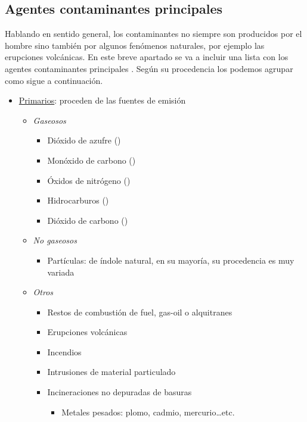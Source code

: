  
  \subsection{Agentes contaminantes principales}
 
 Hablando en sentido general, los contaminantes no siempre son producidos por el hombre sino también por algunos fenómenos naturales, por ejemplo las erupciones volcánicas. En este breve apartado se va a incluir una lista con los agentes contaminantes principales \cite{_sistema_vigilancia_madrid}. Según su procedencia los podemos agrupar como sigue a continuación.
 
 \begin{itemize}
 	\item \underline{Primarios}: proceden de las fuentes de emisión
 	\begin{itemize}
 		\item \textit{Gaseosos}
 			\begin{itemize}
 				\item 	Dióxido de azufre ()
 				\item 	Monóxido de carbono ()
 				\item 	Óxidos de nitrógeno ()
 				\item 	Hidrocarburos ()
 				\item 	Dióxido de carbono ()
 		    \end{itemize}
 		\item \textit{No gaseosos}
 			\begin{itemize}
 			\item Partículas: de índole  natural, en su mayoría, su procedencia es muy variada
 		   \end{itemize}
 	   	\item \textit{Otros}
 	   \begin{itemize}
 	   	\item 	  Restos de combustión de fuel, gas-oil o alquitranes
 	   	\item 	Erupciones volcánicas
 	   	\item 	Incendios
 	   	\item 	Intrusiones de material particulado
 	   	\item 	 Incineraciones no depuradas de basuras
 	   	\begin{itemize}
 	   		\item Metales pesados: plomo, cadmio, mercurio\ldots etc.
 	   	\end{itemize}
 	   \end{itemize}

\end{itemize}
\end{itemize}
